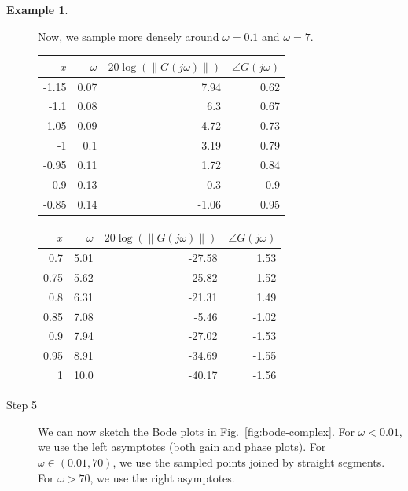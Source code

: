 \documentclass[a4paper,11pt]{report}
\theoremstyle{definition}
\newtheorem{mdexample}{Example}
\newenvironment{example}%
  {\vspace{0.1cm}\begin{mdframed}[backgroundcolor=lightgray]\begin{mdexample}}%
  {\end{mdexample}\end{mdframed}\vspace{0.1cm}}
\begin{document}
\begin{example}
\begin{description}
  Now, we sample more densely around $\omega=0.1$ and $\omega=7$.

  \begin{tabular}{|r|r|r|r|}
    \hline
    $x$ & $\omega$ & $20\log(\|G(j\omega)\|)$ & $\angle G(j\omega)$\\
    \hline
    -1.15 & 0.07 & 7.94 & 0.62 \\
    -1.1 & 0.08 & 6.3 & 0.67 \\
    -1.05 & 0.09 & 4.72 & 0.73 \\
    -1 & 0.1 & 3.19 & 0.79 \\
    -0.95 & 0.11 & 1.72 & 0.84 \\
    -0.9 & 0.13 & 0.3 & 0.9 \\
    -0.85 & 0.14 & -1.06 & 0.95 \\
    \hline
  \end{tabular}

  \begin{tabular}{|r|r|r|r|}
    \hline
    $x$ & $\omega$ & $20\log(\|G(j\omega)\|)$ & $\angle G(j\omega)$\\
    \hline
    0.7 & 5.01 & -27.58 & 1.53 \\
    0.75 & 5.62 & -25.82 & 1.52 \\
    0.8 & 6.31 & -21.31 & 1.49 \\
    0.85 & 7.08 & -5.46 & -1.02 \\
    0.9 & 7.94 & -27.02 & -1.53 \\
    0.95 & 8.91 & -34.69 & -1.55 \\
    1 & 10.0 & -40.17 & -1.56 \\
    \hline
  \end{tabular}

  \item[Step 5] We can now sketch the Bode plots in
    Fig.~\ref{fig:bode-complex}. For $\omega<0.01$, we use the left
    asymptotes (both gain and phase plots). For $\omega\in(0.01,70)$,
    we use the sampled points joined by straight segments. For
    $\omega>70$, we use the right asymptotes.


\end{description}
\end{example}
\end{document}
